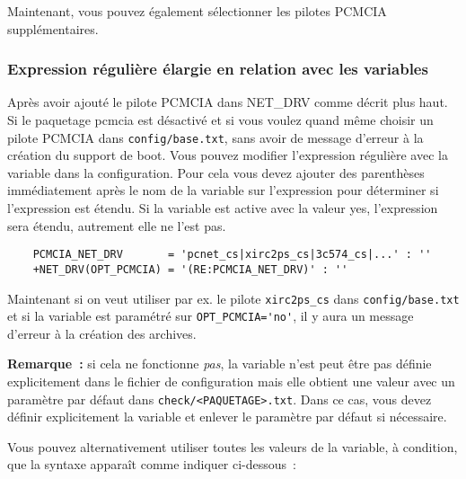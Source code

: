 Maintenant, vous pouvez également sélectionner les pilotes PCMCIA supplémentaires.


\subsubsection{Expression régulière élargie en relation avec les variables }

Après avoir ajouté le pilote PCMCIA dans NET\_DRV comme décrit plus haut.
Si le paquetage \og{}pcmcia\fg{} est désactivé et si vous voulez quand même choisir
un pilote PCMCIA dans \texttt{config/base.txt}, sans avoir de message d'erreur à
la création du support de boot. Vous pouvez modifier l'expression régulière avec la
variable  dans la configuration. Pour cela vous devez ajouter des parenthèses
immédiatement après le nom de la variable sur l'expression pour déterminer
si l'expression est étendu. Si la variable est active avec la valeur \og{}yes\fg{},
l'expression sera étendu, autrement elle ne l'est pas.

\begin{example}
\begin{verbatim}
    PCMCIA_NET_DRV       = 'pcnet_cs|xirc2ps_cs|3c574_cs|...' : ''
    +NET_DRV(OPT_PCMCIA) = '(RE:PCMCIA_NET_DRV)' : ''
\end{verbatim}
\end{example}

Maintenant si on veut utiliser par ex. le pilote \texttt{xirc2ps\_cs} dans \texttt{config/base.txt} et
si la variable est paramétré sur \verb+OPT_PCMCIA='no'+, il y aura un message
d’erreur à la création des archives.

\textbf{Remarque~:} si cela ne fonctionne \emph{pas}, la variable n'est peut être pas définie
explicitement dans le fichier de configuration mais elle obtient une valeur avec un paramètre
par défaut dans \texttt{check/<PAQUETAGE>.txt}. Dans ce cas, vous devez définir explicitement
la variable et enlever le paramètre par défaut si nécessaire.



Vous pouvez alternativement utiliser toutes les valeurs de la variable, à
condition, que la syntaxe apparaît comme indiquer ci-dessous~:

